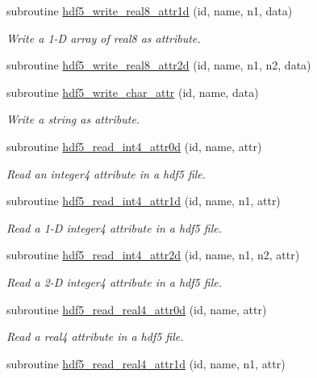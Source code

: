 \begin{DoxyCompactItemize}
subroutine \hyperlink{namespacemodhdf5_ad55b7cffc861305840d5f160ba6fa1fd}{hdf5\+\_\+write\+\_\+real8\+\_\+attr1d} (id, name, n1, data)
\begin{DoxyCompactList}\small\item\em Write a 1-\/D array of real8 as attribute. \end{DoxyCompactList}\item 
subroutine \hyperlink{namespacemodhdf5_a71ef9213132fb3f757d29f58f9c20966}{hdf5\+\_\+write\+\_\+real8\+\_\+attr2d} (id, name, n1, n2, data)
\item 
subroutine \hyperlink{namespacemodhdf5_ad6fea34611cf76b56b5143cd182b8484}{hdf5\+\_\+write\+\_\+char\+\_\+attr} (id, name, data)
\begin{DoxyCompactList}\small\item\em Write a string as attribute. \end{DoxyCompactList}\item 
subroutine \hyperlink{namespacemodhdf5_a10a4b5212d77e52dba2616ba3abb7df1}{hdf5\+\_\+read\+\_\+int4\+\_\+attr0d} (id, name, attr)
\begin{DoxyCompactList}\small\item\em Read an integer4 attribute in a hdf5 file. \end{DoxyCompactList}\item 
subroutine \hyperlink{namespacemodhdf5_a2ff1b28dd896cc37583e97a52348039f}{hdf5\+\_\+read\+\_\+int4\+\_\+attr1d} (id, name, n1, attr)
\begin{DoxyCompactList}\small\item\em Read a 1-\/D integer4 attribute in a hdf5 file. \end{DoxyCompactList}\item 
subroutine \hyperlink{namespacemodhdf5_a4ca8f47995bf9df5b6c892781c87dd95}{hdf5\+\_\+read\+\_\+int4\+\_\+attr2d} (id, name, n1, n2, attr)
\begin{DoxyCompactList}\small\item\em Read a 2-\/D integer4 attribute in a hdf5 file. \end{DoxyCompactList}\item 
subroutine \hyperlink{namespacemodhdf5_a6cf3b8369d7cbc96e8639439eb7c51ff}{hdf5\+\_\+read\+\_\+real4\+\_\+attr0d} (id, name, attr)
\begin{DoxyCompactList}\small\item\em Read a real4 attribute in a hdf5 file. \end{DoxyCompactList}\item 
subroutine \hyperlink{namespacemodhdf5_acd7e7ad91ecc73c632ddc76468dbd083}{hdf5\+\_\+read\+\_\+real4\+\_\+attr1d} (id, name, n1, attr)

\end{DoxyCompactItemize}
